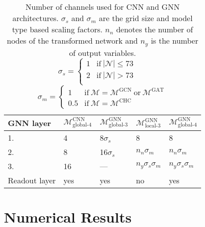 \documentclass[journal]{IEEEtran}
\newcommand{\Node}{\mathcal{N}}
\begin{document}
\begin{table}[!h]
    \caption{Number of channels used for CNN and GNN architectures. $\sigma_{s}$ and $\sigma_{m}$ are the grid size and model type based scaling factors. $n_{n}$ denotes the number of nodes of the transformed network and $n_{y}$ is the number of output variables.\\\hspace{\textwidth}
    $\sigma_{s} = \begin{cases} 1 & \mathrm{if\ |\Node| \le 73} \\ 2 & \mathrm{if\ |\Node| > 73} \\ \end{cases}$ \ \ 
    $\sigma_{m} = \begin{cases} 1 & \mathrm{if \ \mathcal{M} = \mathcal{M}^{\textrm{GCN}} \ or\ \mathcal{M}^{\textrm{GAT}}} \\ 0.5 & \mathrm{if \ \mathcal{M} = \mathcal{M}^{\textrm{CHC}}} \end{cases}$}
    \label{tab:layers}
    \centering
    \begin{tabular}{lllll}
        \toprule
        GNN layer &
        $\mathcal{M}^{\textrm{CNN}}_{\textrm{global-4}}$ & $\mathcal{M}^{\textrm{GNN}}_{\textrm{global-3}}$ & $\mathcal{M}^{\textrm{GNN}}_{\textrm{local-3}}$ & $\mathcal{M}^{\textrm{GNN}}_{\textrm{global-4}}$ \\
        \midrule
        1. & 4 & 8$\sigma_{s}$ & 8 & 8 \\
        2. & 8 & 16$\sigma_{s}$ & $n_{n}\sigma_{m}$ & $n_{n}\sigma_{m}$ \\
        3. & 16 & --- & $n_{y}\sigma_{s}\sigma_{m}$ & $n_{y}\sigma_{s}\sigma_{m}$ \\
        \midrule
        Readout layer & yes & yes & no & yes \\
        \bottomrule
    \end{tabular}
\end{table}

\section{Numerical Results}
\end{document}
